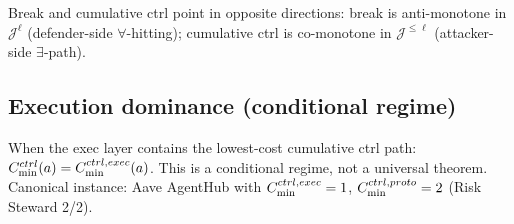 \begin{remark}
Break and cumulative ctrl point in opposite directions:
break is anti-monotone in $\mathcal{J}^\ell$ (defender-side $\forall$-hitting);
cumulative ctrl is co-monotone in $\mathcal{J}^{\le\ell}$ (attacker-side $\exists$-path).
\end{remark}

\subsection{Execution dominance (conditional regime)}

\begin{proposition}
When the exec layer contains the lowest-cost cumulative ctrl path:
$C_{\min}^{ctrl}(a)=C_{\min}^{ctrl,exec}(a)$.
This is a conditional regime, not a universal theorem.
Canonical instance: Aave AgentHub with $C_{\min}^{ctrl,exec}=1$,
$C_{\min}^{ctrl,proto}=2$ (Risk Steward 2/2).
\end{proposition}

